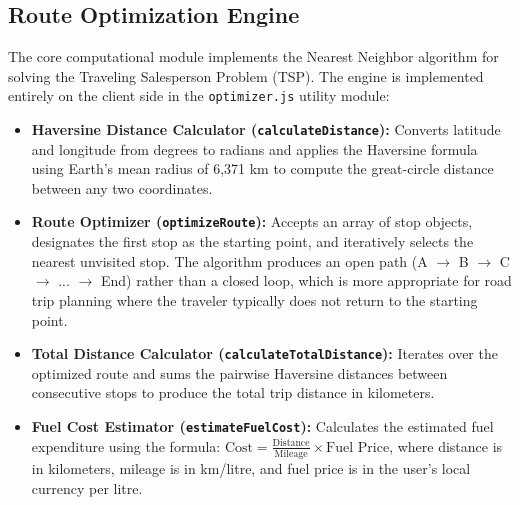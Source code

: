 \subsection{Route Optimization Engine}
The core computational module implements the Nearest Neighbor algorithm for solving the Traveling Salesperson Problem (TSP). The engine is implemented entirely on the client side in the \texttt{optimizer.js} utility module:
\begin{itemize}
    \item \textbf{Haversine Distance Calculator (\texttt{calculateDistance}):} Converts latitude and longitude from degrees to radians and applies the Haversine formula using Earth's mean radius of 6,371 km to compute the great-circle distance between any two coordinates.
    \item \textbf{Route Optimizer (\texttt{optimizeRoute}):} Accepts an array of stop objects, designates the first stop as the starting point, and iteratively selects the nearest unvisited stop. The algorithm produces an open path (A $\rightarrow$ B $\rightarrow$ C $\rightarrow$ ... $\rightarrow$ End) rather than a closed loop, which is more appropriate for road trip planning where the traveler typically does not return to the starting point.
    \item \textbf{Total Distance Calculator (\texttt{calculateTotalDistance}):} Iterates over the optimized route and sums the pairwise Haversine distances between consecutive stops to produce the total trip distance in kilometers.
    \item \textbf{Fuel Cost Estimator (\texttt{estimateFuelCost}):} Calculates the estimated fuel expenditure using the formula: $\text{Cost} = \frac{\text{Distance}}{\text{Mileage}} \times \text{Fuel Price}$, where distance is in kilometers, mileage is in km/litre, and fuel price is in the user's local currency per litre.
\end{itemize}

